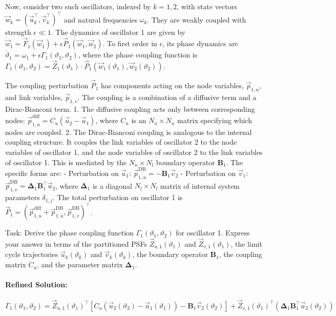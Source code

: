 \documentclass[10pt]{article}
\begin{document}
Now, consider two such oscillators, indexed by $k=1,2$, with state vectors $\vec{w}_k = (\vec{u}_k^\top, \vec{v}_k^\top)^\top$ and natural frequencies $\omega_k$. They are weakly coupled with strength $\epsilon \ll 1$. The dynamics of oscillator 1 are given by $\dot{\vec{w}}_1 = \vec{F}_1(\vec{w}_1) + \epsilon \vec{P}_1(\vec{w}_1, \vec{w}_2)$. To first order in $\epsilon$, its phase dynamics are $\dot{\vartheta}_1 = \omega_1 + \epsilon \Gamma_1(\vartheta_1, \vartheta_2)$, where the phase coupling function is $\Gamma_1(\vartheta_1, \vartheta_2) = \vec{Z}_1(\vartheta_1) \cdot \vec{P}_1(\vec{w}_1(\vartheta_1), \vec{w}_2(\vartheta_2))$.

The coupling perturbation $\vec{P}_1$ has components acting on the node variables, $\vec{p}_{1,u}$, and link variables, $\vec{p}_{1,v}$. The coupling is a combination of a diffusive term and a Dirac-Bianconi term.
1. The diffusive coupling acts only between corresponding nodes: $\vec{p}_{1,u}^{\text{diff}} = C_u(\vec{u}_2 - \vec{u}_1)$, where $C_u$ is an $N_n \times N_n$ matrix specifying which nodes are coupled.
2. The Dirac-Bianconi coupling is analogous to the internal coupling structure. It couples the link variables of oscillator 2 to the node variables of oscillator 1, and the node variables of oscillator 2 to the link variables of oscillator 1. This is mediated by the $N_n \times N_l$ boundary operator $\boldsymbol{B}_1$. The specific forms are:
   - Perturbation on $\vec{u}_1$: $\vec{p}_{1,u}^{\text{DB}} = - \boldsymbol{B}_1 \vec{v}_2$
   - Perturbation on $\vec{v}_1$: $\vec{p}_{1,v}^{\text{DB}} = \boldsymbol{\Delta}_1 \boldsymbol{B}_1^\top \vec{u}_2$, where $\boldsymbol{\Delta}_1$ is a diagonal $N_l \times N_l$ matrix of internal system parameters $\delta_{1,j}$.
The total perturbation on oscillator 1 is $\vec{P}_1 = (\vec{p}_{1,u}^{\text{diff}} + \vec{p}_{1,u}^{\text{DB}}, \vec{p}_{1,v}^{\text{DB}})^\top$.

Task:
Derive the phase coupling function $\Gamma_1(\vartheta_1, \vartheta_2)$ for oscillator 1. Express your answer in terms of the partitioned PSFs $\vec{Z}_{u,1}(\vartheta_1)$ and $\vec{Z}_{v,1}(\vartheta_1)$, the limit cycle trajectories $\vec{u}_k(\vartheta_k)$ and $\vec{v}_k(\vartheta_k)$, the boundary operator $\boldsymbol{B}_1$, the coupling matrix $C_u$, and the parameter matrix $\boldsymbol{\Delta}_1$.

\paragraph*{Refined Solution:}
\[ \Gamma_1(\vartheta_1, \vartheta_2) = \vec{Z}_{u,1}(\vartheta_1)^\top \left[ C_u(\vec{u}_2(\vartheta_2) - \vec{u}_1(\vartheta_1)) - \boldsymbol{B}_1 \vec{v}_2(\vartheta_2) \right] + \vec{Z}_{v,1}(\vartheta_1)^\top \left( \boldsymbol{\Delta}_1 \boldsymbol{B}_1^\top \vec{u}_2(\vartheta_2) \right) \]
\end{document}
